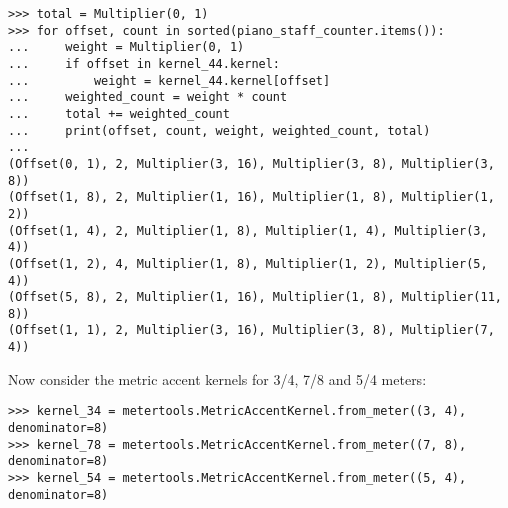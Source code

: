 \begin{comment}
<abjad>
total = Multiplier(0, 1)
for offset, count in sorted(piano_staff_counter.items()):
    weight = Multiplier(0, 1)
    if offset in kernel_44.kernel:
        weight = kernel_44.kernel[offset]
    weighted_count = weight * count
    total += weighted_count
    print(offset, count, weight, weighted_count, total)

</abjad>
\end{comment}

\begin{singlespacing}
\vspace{-0.5\baselineskip}
\begin{lstlisting}
>>> total = Multiplier(0, 1)
>>> for offset, count in sorted(piano_staff_counter.items()):
...     weight = Multiplier(0, 1)
...     if offset in kernel_44.kernel:
...         weight = kernel_44.kernel[offset]
...     weighted_count = weight * count
...     total += weighted_count
...     print(offset, count, weight, weighted_count, total)
...
(Offset(0, 1), 2, Multiplier(3, 16), Multiplier(3, 8), Multiplier(3, 8))
(Offset(1, 8), 2, Multiplier(1, 16), Multiplier(1, 8), Multiplier(1, 2))
(Offset(1, 4), 2, Multiplier(1, 8), Multiplier(1, 4), Multiplier(3, 4))
(Offset(1, 2), 4, Multiplier(1, 8), Multiplier(1, 2), Multiplier(5, 4))
(Offset(5, 8), 2, Multiplier(1, 16), Multiplier(1, 8), Multiplier(11, 8))
(Offset(1, 1), 2, Multiplier(3, 16), Multiplier(3, 8), Multiplier(7, 4))
\end{lstlisting}
\end{singlespacing}

\noindent Now consider the metric accent kernels for 3/4, 7/8 and 5/4 meters:

\begin{comment}
<abjad>
kernel_34 = metertools.MetricAccentKernel.from_meter((3, 4), denominator=8)
kernel_78 = metertools.MetricAccentKernel.from_meter((7, 8), denominator=8)
kernel_54 = metertools.MetricAccentKernel.from_meter((5, 4), denominator=8)
</abjad>
\end{comment}

\begin{singlespacing}
\vspace{-0.5\baselineskip}
\begin{lstlisting}
>>> kernel_34 = metertools.MetricAccentKernel.from_meter((3, 4), denominator=8)
>>> kernel_78 = metertools.MetricAccentKernel.from_meter((7, 8), denominator=8)
>>> kernel_54 = metertools.MetricAccentKernel.from_meter((5, 4), denominator=8)
\end{lstlisting}
\end{singlespacing}

